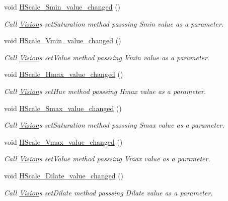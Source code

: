 \begin{DoxyCompactItemize}
void \hyperlink{class_vision_g_u_i_a4e521dabf97b0820f40272290b471ed2}{H\+Scale\+\_\+\+Smin\+\_\+value\+\_\+changed} ()
\begin{DoxyCompactList}\small\item\em Call \hyperlink{class_vision}{Vision}\textquotesingle{}s set\+Saturation method passsing Smin value as a parameter. \end{DoxyCompactList}\item 
void \hyperlink{class_vision_g_u_i_aaba5ce7bcd87c9ce9101f409695b3bd9}{H\+Scale\+\_\+\+Vmin\+\_\+value\+\_\+changed} ()
\begin{DoxyCompactList}\small\item\em Call \hyperlink{class_vision}{Vision}\textquotesingle{}s set\+Value method passsing Vmin value as a parameter. \end{DoxyCompactList}\item 
void \hyperlink{class_vision_g_u_i_ad12a91dfc3c8cd3ef213d4d518d85267}{H\+Scale\+\_\+\+Hmax\+\_\+value\+\_\+changed} ()
\begin{DoxyCompactList}\small\item\em Call \hyperlink{class_vision}{Vision}\textquotesingle{}s set\+Hue method passsing Hmax value as a parameter. \end{DoxyCompactList}\item 
void \hyperlink{class_vision_g_u_i_a37cc33977d0cfdb559bf156ffad949ad}{H\+Scale\+\_\+\+Smax\+\_\+value\+\_\+changed} ()
\begin{DoxyCompactList}\small\item\em Call \hyperlink{class_vision}{Vision}\textquotesingle{}s set\+Saturation method passsing Smax value as a parameter. \end{DoxyCompactList}\item 
void \hyperlink{class_vision_g_u_i_a8446a9425209abafa824d6a8cb539248}{H\+Scale\+\_\+\+Vmax\+\_\+value\+\_\+changed} ()
\begin{DoxyCompactList}\small\item\em Call \hyperlink{class_vision}{Vision}\textquotesingle{}s set\+Value method passsing Vmax value as a parameter. \end{DoxyCompactList}\item 
void \hyperlink{class_vision_g_u_i_a77d74bbe2fdcc16d5cf18094d257d219}{H\+Scale\+\_\+\+Dilate\+\_\+value\+\_\+changed} ()
\begin{DoxyCompactList}\small\item\em Call \hyperlink{class_vision}{Vision}\textquotesingle{}s set\+Dilate method passsing Dilate value as a parameter. \end{DoxyCompactList}\item 

\end{DoxyCompactItemize}
